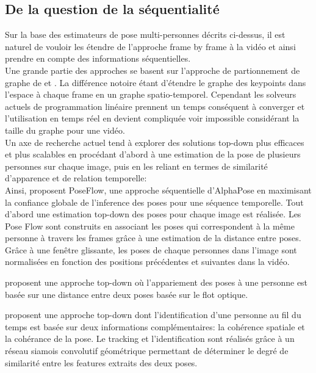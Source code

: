 \subsection{De la question de la séquentialité}
Sur la base des estimateurs de pose multi-personnes décrits ci-dessus, il est naturel de vouloir les étendre
de l'approche frame by frame à la vidéo et ainsi prendre en compte des informations séquentielles.\\

Une grande partie des approches se basent sur l'approche de partionnement de graphe de \cite{2015arXiv151106645P} et \cite{2016arXiv160503170I}. La différence notoire étant d'étendre le graphe des keypoints dans l'espace à chaque frame en un graphe spatio-temporel. Cependant les solveurs actuels de programmation linéaire prennent un temps conséquent à converger et l'utilisation en temps réel en devient compliquée voir impossible considérant la taille du graphe pour une vidéo.\\

Un axe de recherche actuel tend à explorer des solutions top-down plus efficaces et plus scalables en procédant d'abord à une estimation de la pose de plusieurs personnes sur chaque image, puis en les reliant
en termes de similarité d'apparence et de relation temporelle:\\

Ainsi, \cite{2018arXiv180200977X} proposent PoseFlow, une approche séquentielle d'AlphaPose \cite{fang2017rmpe} en maximisant la confiance globale de l'inference des poses pour une séquence temporelle. Tout d'abord une estimation top-down des poses pour chaque image est réalisée. Les Pose Flow sont construits en associant les poses qui correspondent à la même personne à travers les frames grâce à une estimation de la distance entre poses. Grâce à une fenêtre glissante, les poses de chaque personnes dans l'image sont normalisées en fonction des positions précédentes et suivantes dans la vidéo.

\cite{2019arXiv190502822N} proposent une approche top-down où l'appariement des poses à une personne est basée sur une distance entre deux poses basée sur le flot optique.

\cite{2018arXiv180406208X} proposent une approche top-down dont l'identification d'une personne au fil du temps est basée sur deux informations complémentaires: la cohérence spatiale et la cohérance de la pose. Le tracking et l'identification sont réalisés grâce à un réseau siamois convolutif géométrique permettant de déterminer le degré de similarité entre les features extraits des deux poses.
 
